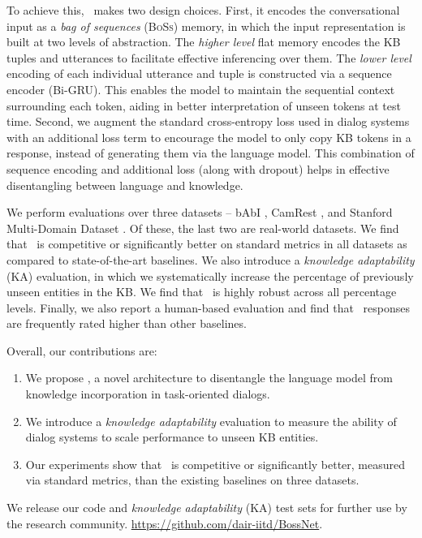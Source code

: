 To achieve this, \sys\ makes two design choices. First, it encodes the conversational input as a {\em bag of sequences} (\textsc{BoSs}) memory, in which the input representation is built at two levels of abstraction. The \emph{higher level} flat memory encodes the KB tuples and utterances to facilitate effective inferencing over them. The \emph{lower level} encoding of each individual utterance and tuple is constructed via a sequence encoder (Bi-GRU). This enables the model to maintain the sequential context surrounding each token, aiding in better interpretation of unseen tokens at test time. Second, we augment the standard cross-entropy loss used in dialog systems with an additional loss term to encourage the model to only copy KB tokens in a response, instead of generating them via the language model. This combination of sequence encoding and additional loss (along with dropout) helps in effective disentangling between language and knowledge.  

We perform evaluations over three datasets -- bAbI \cite{BordesW16}, CamRest \cite{wenEMNLP2016}, and Stanford Multi-Domain Dataset \cite{Ericsigdial}. Of these, the last two are real-world datasets. We find that \sys\ is competitive or significantly better on standard metrics in all datasets as compared to state-of-the-art baselines. We also introduce a {\em knowledge adaptability} (KA) evaluation, in which we systematically increase the percentage of previously unseen entities in the KB. We find that \sys\ is highly robust across all percentage levels. Finally, we also report a human-based evaluation and find that \sys\ responses are frequently rated higher than other baselines.  

Overall, our contributions are:

\begin{enumerate}
    \item We propose \sys, a novel architecture to disentangle the language model from knowledge incorporation in task-oriented dialogs.
    \item We introduce a {\em knowledge adaptability} evaluation to measure the ability of dialog systems to scale performance to unseen KB entities.
    \item Our experiments show that \sys\ is competitive or significantly better, measured via standard metrics, than the existing baselines on three datasets.
\end{enumerate}

We release our code and {\em knowledge adaptability} (KA) test sets for further use by the research community. \url{ https://github.com/dair-iitd/BossNet}. 

